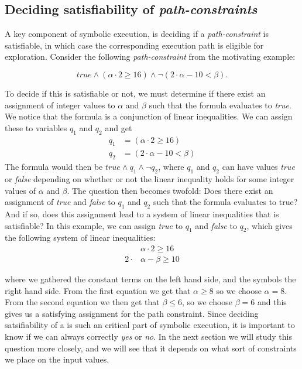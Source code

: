 	\subsection{Deciding satisfiability of \emph{path-constraints}}
	A key component of symbolic execution, is deciding if a \emph{path-constraint} is satisfiable, in which case the corresponding execution path is eligible for exploration. Consider the following \emph{path-constraint} from the motivating example:
	
	\begin{equation*}	
		true \land (\alpha \cdot 2 \geq 16) \land \neg (2\cdot \alpha - 10 < \beta).
	\end{equation*}
	
	To decide if this is satisfiable or not, we must determine if there exist an assignment of integer values to $\alpha$ and $\beta$ such that the formula evaluates to \emph{true}. We notice that the formula is a conjunction of linear inequalities. We can assign these to variables $q_1$ and $q_2$ and get
	\begin{align*}
		q_1 & = (\alpha \cdot 2 \geq 16) \\
		q_2 & = (2\cdot \alpha - 10 < \beta)
	\end{align*}
	The formula would then be $true\land q_1 \land \neg q_2$,
	where $q_1$ and $q_2$ can have values \emph{true} or \emph{false} depending on whether or not the linear inequality holds for some integer values of $\alpha$ and $\beta$. The question then becomes twofold: Does there exist an assignment of \emph{true} and \emph{false} to $q_1$ and $q_2$ such that the formula evaluates to true? And if so, does this assignment lead to a system of linear inequalities that is satisfiable?
	In this example, we can assign \emph{true} to $q_1$ and \emph{false} to $q_2$, which gives the following system of linear inequalities:
	\begin{align*}
		& \alpha \cdot 2 \geq 16 \\
		2  \cdot & \alpha - \beta \geq 10 
	\end{align*}
	
	where we gathered the constant terms on the left hand side, and the symbols the right hand side. From the first equation we get that $\alpha \geq 8$ so we choose $\alpha = 8$. From the second equation we then get that $\beta \leq 6$, so we choose $\beta = 6$ and this gives us a satisfying assignment for the path constraint. Since deciding satsifiability of a \pc is such an critical part of symbolic execution, it is important to know if we can always correctly \emph{yes} or \emph{no}. In the next section we will study this question more closely, and we will see that it depends on what sort of constraints we place on the input values. 
